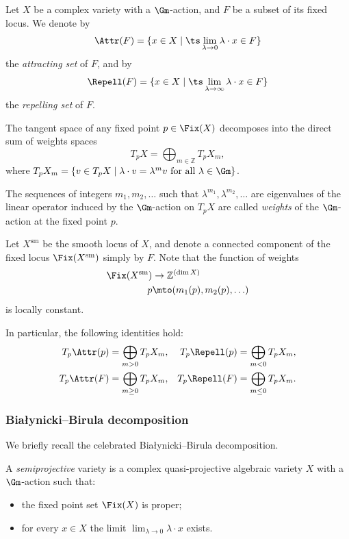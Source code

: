 \label{sec:attrrepell}
\begin{defn}
Let $X$ be a complex variety with a $\Gm$\nobreakdash-action, and $F$ be a subset of its fixed locus. We denote by
\[
\Attr(F)= \{ x \in X \mid \ts\lim_{\lambda \to 0} \lambda \cdot x \in F \}
\]
the \emph{attracting set} of $F$, and by
\[
\Repell(F)= \{ x \in X \mid\ts\lim_{\lambda \to \infty} \lambda \cdot x \in F \}
\]
the \emph{repelling set} of $F$.
\end{defn}

The tangent space of any fixed point $p \in \Fix(X)$ decomposes into the direct sum of weights spaces
\[
T_p X = \bigoplus_{m \in \mathbb{Z}} T_p X_{m},
\]
where $T_p X_m = \{ v \in T_p X \mid \lambda \cdot v = \lambda^m v \text{ for all }\lambda \in \Gm \}$.

\begin{defn}
The sequences of integers $m_1, m_2, \ldots$ such that $\lambda^{m_1}, \lambda^{m_2}, \ldots$ are eigenvalues of the linear operator induced by the $\Gm$\nobreakdash-action on $T_p X$ are called \emph{weights} of the $\Gm$\nobreakdash-action at the fixed point $p$.
\end{defn}
Let $X^{\mathrm{sm}}$ be the smooth locus of $X$, and denote a connected component of the fixed locus $\Fix(X^{\mathrm{sm}})$ simply by $F$. Note that the function of weights
\begin{align*}
\Fix(X^{\mathrm{sm}}) & \to \mathbb{Z}^{(\dim X)}\\
p & \mto (m_1(p), m_2(p), \ldots )
\end{align*} is locally constant.

In particular, the following identities hold:
\begin{align}\label{eq:dimTangattractor}
T_p \Attr(p)&= \bigoplus_{m>0} T_p X_{m},& T_p \Repell(p)&= \bigoplus_{m<0} T_p X_{m},
\\
\label{eq:dimensiontangentspace}
T_p \Attr(F)&= \bigoplus_{m\geq 0} T_p X_{m},& T_p \Repell(F)&= \bigoplus_{m\leq 0} T_p X_{m}.
\end{align}

\subsubsection{Białynicki--Birula decomposition}
We briefly recall the celebrated Białynicki--Birula decomposition.
\begin{defn}
A \emph{semiprojective} variety is a complex quasi-projective algebraic variety $X$ with a $\Gm$\nobreakdash-action such that:
\begin{itemize}
\item the fixed point set $\Fix(X)$ is proper;
\item for every $x \in X$ the limit $\lim_{\lambda \to 0} \lambda \cdot x$ exists.
\end{itemize}
\end{defn}

